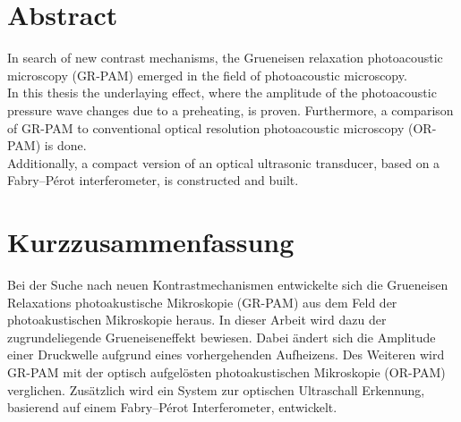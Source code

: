 \section*{}
\newpage
\thispagestyle{empty}
\section*{Abstract}

In search of new contrast mechanisms, the Grueneisen relaxation photoacoustic microscopy (GR-PAM) emerged in the field of photoacoustic microscopy. \\
In this thesis the underlaying effect, where the amplitude of the photoacoustic pressure wave changes due to a preheating, is proven. Furthermore, a comparison of GR-PAM to conventional optical resolution photoacoustic microscopy (OR-PAM) is done. \\
Additionally, a compact version of an optical ultrasonic transducer, based on a Fabry–P\'{e}rot interferometer, is constructed and built.\\

\section*{Kurzzusammenfassung}

Bei der Suche nach neuen Kontrastmechanismen entwickelte sich die Grueneisen Relaxations photoakustische Mikroskopie (GR-PAM) aus dem Feld der photoakustischen Mikroskopie heraus.
In dieser Arbeit wird dazu der zugrundeliegende Grueneiseneffekt bewiesen. Dabei ändert sich die Amplitude einer Druckwelle aufgrund eines vorhergehenden Aufheizens. Des Weiteren wird GR-PAM mit der optisch aufgelösten photoakustischen Mikroskopie (OR-PAM) verglichen. 
Zusätzlich wird ein System zur optischen Ultraschall Erkennung, basierend auf einem Fabry–P\'{e}rot Interferometer, entwickelt.  


\newpage
\thispagestyle{empty}
\section*{}



